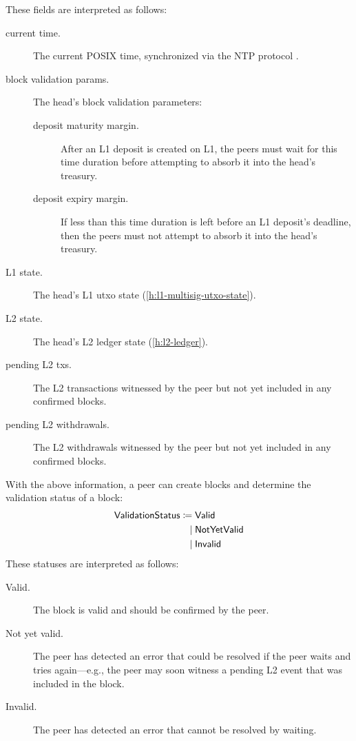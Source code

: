 \documentclass[../hydrozoa.tex]{subfiles}
\begin{document}
These fields are interpreted as follows:
\begin{description}
  \item[current time.] The current POSIX time, synchronized via the NTP protocol \citep{MillsEtAlNetworkTimeProtocol2010}.
  \item[block validation params.] The head's block validation parameters:
    \begin{description}
      \item[deposit maturity margin.] After an L1 deposit is created on L1, the peers must wait for this time duration before attempting to absorb it into the head's treasury.
      \item[deposit expiry margin.] If less than this time duration is left before an L1 deposit's deadline, then the peers must not attempt to absorb it into the head's treasury.
    \end{description}
  \item[L1 state.] The head's L1 utxo state (\cref{h:l1-multisig-utxo-state}).
  \item[L2 state.] The head's L2 ledger state (\cref{h:l2-ledger}).
  \item[pending L2 txs.] The L2 transactions witnessed by the peer but not yet included in any confirmed blocks.
  \item[pending L2 withdrawals.] The L2 withdrawals witnessed by the peer but not yet included in any confirmed blocks.
\end{description}

With the above information, a peer can create blocks and determine the validation status of a block:
\begin{equation}
\begin{split}
  \mathsf{ValidationStatus} \coloneq&\;
    \mathsf{Valid} \\\mid&\;
    \mathsf{NotYetValid} \\\mid&\;
    \mathsf{Invalid}
\end{split}
\end{equation}
These statuses are interpreted as follows:
\begin{description}
  \item[Valid.] The block is valid and should be confirmed by the peer.
  \item[Not yet valid.] The peer has detected an error that could be resolved if the peer waits and tries again---e.g., the peer may soon witness a pending L2 event that was included in the block.
  \item[Invalid.] The peer has detected an error that cannot be resolved by waiting.
\end{description}
\end{document}
